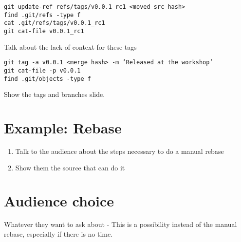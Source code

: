 \documentclass[a4paper,12pt]{article}
\begin{document}
\vspace{0.1in}

\texttt{git update-ref refs/tags/v0.0.1\_rc1 <moved src hash>\\
find .git/refs -type f\\
cat .git/refs/tags/v0.0.1\_rc1\\
git cat-file v0.0.1\_rc1}

\vspace{0.1in}

Talk about the lack of context for these tags

\vspace{0.1in}

\texttt{git tag -a v0.0.1 <merge hash> -m 'Released at the workshop'\\
git cat-file -p v0.0.1\\
find .git/objects -type f}

\vspace{0.1in}

Show the tags and branches slide.

\section*{Example: Rebase}
\begin{enumerate}
  \item Talk to the audience about the steps necessary to do a manual rebase
  \item Show them the source that can do it
\end{enumerate}

\section*{Audience choice}

Whatever they want to ask about - This is a possibility instead of the manual
rebase, especially if there is no time.
\end{document}
